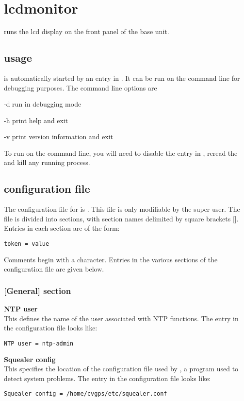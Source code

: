\section{lcdmonitor}

 runs the lcd display on the front panel of the base unit.

\subsection{usage}
 is automatically started by an entry in . It can be run on
the command line for debugging purposes. The command line options are
\begin{description*}
	\item[-d]	run in debugging mode
	\item[-h]	print help and exit
	\item[-v]	print version information and exit
\end{description*}
To run  on the command line, you will need to disable the entry in ,
reread the  and kill any running  process.

\subsection{configuration file \label{confformat}}

The configuration file for  is . This file is
only modifiable by the super-user. The file is divided into
sections, with section names delimited by square brackets [\space]. Entries in each section
are of the form:
\begin{lstlisting}
token = value
\end{lstlisting}
Comments begin with a \cc{\#} character. Entries in the various sections of the configuration file
are given below. 

\subsubsection{[General] section}

{\bfseries NTP user}\\
This  defines the name of the user associated with NTP functions.
The entry in the configuration file looks like:
\begin{lstlisting}
NTP user = ntp-admin
\end{lstlisting}
{\bfseries Squealer config}\\
This  specifies the location of the configuration file used by , a
program used to detect system problems.
The entry in the configuration file looks like:
\begin{lstlisting}
Squealer config = /home/cvgps/etc/squealer.conf
\end{lstlisting}

